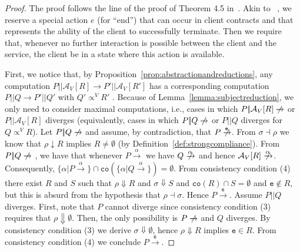\documentclass[submission,copyright,creativecommons]{eptcs}
\newcommand{\ppar}{|\!|}
\begin{document}
\begin{proof} The proof follows the line of the proof of Theorem 4.5 in~\cite{CGP09:TCWS}.
 Akin to ~\cite{CGP09:TCWS}, we reserve a special action $e$ (for ``end'') that can occur in 
 client contracts and that represents the ability of the client to successfully terminate. 
 Then we require that, whenever no further interaction is possible between the client and 
 the service, the client be in a state where this action is available.

 First, we notice that, by Proposition~\ref{prop:abstractionandreductions}, any computation 
 $P || \mathcal{A}_V[R] \rightarrow P' || \mathcal{A}_V[R']$ has a corresponding computation
 $P || Q \rightarrow P' || Q'$ with $Q' \propto^V R'$ .
Because of Lemma~\ref{lemma:subjectreduction}, we only need to 
 consider maximal computations, i.e., cases in which $P\ppar \mathcal{A}_V[R] \centernot{\xrightarrow{}}$ or $P\ppar \mathcal{A}_V[R]$ diverges 
 (equivalently, cases in which $P\ppar Q \centernot{\xrightarrow{}}$ or $P\ppar Q$ diverges for $Q \propto^V R$).
 Let $P\ppar Q \centernot{\xrightarrow{}}$ and assume, 
by contradiction, that $P \centernot{\xrightarrow{\mathtt{e}}}$. From $\sigma \dashv \rho$ we know that $\rho\downarrow R$ 
implies $R\neq \emptyset$ (by Definition~\ref{def:strongcompliance}). From 
$P\ppar Q\centernot{\xrightarrow{}}$ , we have that whenever $P\xrightarrow{\alpha}$ we have $Q\centernot{\xrightarrow{\alpha}}$ and hence $\mathcal{A}_V[R]\centernot{\xrightarrow{\alpha}}$. Consequently, $\{\alpha | P \xrightarrow{\alpha}\} \cap \mathtt{co}(\{\alpha | Q \xrightarrow{\alpha}\}) = \emptyset$. 
From consistency condition (4) there exist $R$ and $S$ such that 
$\rho\Downarrow R$ and $\sigma\Downarrow S$ and $\mathtt{co}(R)\cap S = \emptyset$
and $\mathtt{e}\not\in R$, but this is absurd from the hypothesis that $\rho\dashv \sigma$. Hence $P\xrightarrow{\mathtt{e}}$.
Assume $P\ppar Q$ diverges. First, note that $P$ cannot diverge since consistency 
condition (3) requires that $\rho\Downarrow\emptyset$.  Then, the only possibility is $P\centernot{\xrightarrow{}}$ 
and $Q$ diverges. By consistency condition (3) we derive $\sigma\Downarrow \emptyset$,
hence $\rho\Downarrow R$ implies $\mathtt{e}\in R$. From consistency condition (4)
we conclude $P\xrightarrow{\mathtt{e}}$. 
\end{proof}
\end{document}

